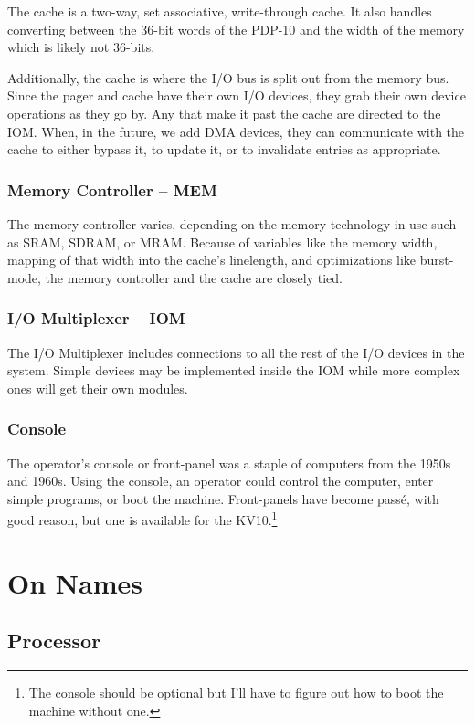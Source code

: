 \documentclass[12pt]{report}
\begin{document}
The cache is a two-way, set associative, write-through cache.  It also handles converting
between the 36-bit words of the PDP-10 and the width of the memory which is likely not
36-bits.

Additionally, the cache is where the I/O bus is split out from the memory bus.  Since the
pager and cache have their own I/O devices, they grab their own device operations as they
go by.  Any that make it past the cache are directed to the IOM.  When, in the future, we
add DMA devices, they can communicate with the cache to either bypass it, to update it, or
to invalidate entries as appropriate.

\subsubsection{Memory Controller -- MEM}

The memory controller varies, depending on the memory technology in use such as SRAM,
SDRAM, or MRAM.  Because of variables like the memory width, mapping of that width into
the cache's linelength, and optimizations like burst-mode, the memory controller and the
cache are closely tied.

\subsubsection{I/O Multiplexer -- IOM}

The I/O Multiplexer includes connections to all the rest of the I/O devices in the system.
Simple devices may be implemented inside the IOM while more complex ones will get their
own modules.

\subsubsection{Console}

The operator's console or front-panel was a staple of computers from the 1950s and 1960s.
Using the console, an operator could control the computer, enter simple programs, or boot
the machine.  Front-panels have become pass\'{e}, with good reason, but one is available
for the KV10.\footnote{The console should be optional but I'll have to figure out how to
  boot the machine without one.}

\section{On Names}

\subsection{Processor}
\end{document}

